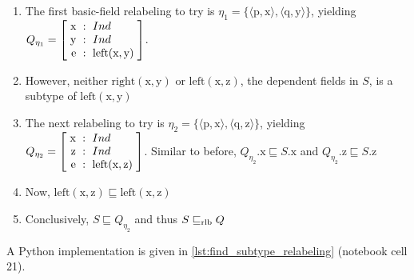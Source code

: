 \begin{enumerate}
\item The first basic-field relabeling to try is $\eta_1 = \{\langle \text{p}, \text{x}\rangle, \langle \text{q}, \text{y}\rangle\}$, yielding $Q_{\eta_1} = \rec{ \text{x} &:& Ind \\ \text{y} &:& Ind \\ \text{e} &:& \text{left}(\text{x}, \text{y}) }$.
\item However, neither $\text{right}(\text{x}, \text{y})$ or $\text{left}(\text{x}, \text{z})$, the dependent fields in $S$, is a subtype of $\text{left}(\text{x}, \text{y})$
\item The next relabeling to try is $\eta_2 = \{\langle \text{p}, \text{x}\rangle, \langle \text{q}, \text{z}\rangle\}$, yielding $Q_{\eta_2} = \rec{ \text{x} &:& Ind \\ \text{z} &:& Ind \\ \text{e} &:& \text{left}(\text{x}, \text{z}) }$.
Similar to before, $Q_{\eta_2}.\text{x} \sqsubseteq S.\text{x}$ and $Q_{\eta_2}.\text{z} \sqsubseteq S.\text{z}$
\item Now, $\text{left}(\text{x}, \text{z}) \sqsubseteq \text{left}(\text{x}, \text{z})$
\item Conclusively, $S \sqsubseteq Q_{\eta_2}$ and thus $S \mathrel{\sqsubseteq_\text{rlb}} Q$
\end{enumerate}


A Python implementation is given in \autoref{lst:find_subtype_relabeling} (notebook cell 21).


